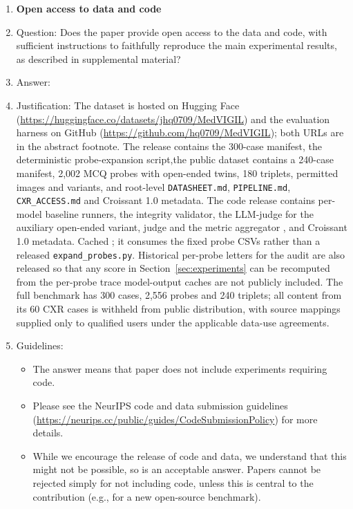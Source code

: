 \documentclass{article}
\providecommand{\DIFaddtex}[1]{{\protect\color{blue} \sf #1}} %
\providecommand{\DIFdeltex}[1]{{\protect\color{red} \scriptsize #1}} %
\providecommand{\DIFaddbegin}{} %
\providecommand{\DIFaddend}{} %
\providecommand{\DIFdelbegin}{} %
\providecommand{\DIFdelend}{} %
\providecommand{\DIFadd}[1]{\texorpdfstring{\DIFaddtex{#1}}{#1}} %
\providecommand{\DIFdel}[1]{\texorpdfstring{\DIFdeltex{#1}}{}} %
\begin{document}
\begin{enumerate}
\item {\bf Open access to data and code}
    \item[] Question: Does the paper provide open access to the data and code, with sufficient instructions to faithfully reproduce the main experimental results, as described in supplemental material?
    \item[] Answer: \answerYes{}
    \item[] Justification: The dataset is hosted on Hugging Face (\url{https://huggingface.co/datasets/jhq0709/MedVIGIL}) and the evaluation harness on GitHub (\url{https://github.com/hq0709/MedVIGIL}); both URLs are in the abstract footnote. The \DIFdelbegin \DIFdel{release contains the 300-case manifest, the deterministic probe-expansion script,the }\DIFdelend \DIFaddbegin \DIFadd{public dataset contains a 240-case manifest, 2,002 MCQ probes with open-ended twins, 180 triplets, permitted images and variants, and root-level \texttt{DATASHEET.md}, \texttt{PIPELINE.md}, \texttt{CXR\_ACCESS.md} and Croissant 1.0 metadata. The code release contains }\DIFaddend per-model baseline runners, the integrity validator, the \DIFdelbegin \DIFdel{LLM-judge for the }\DIFdelend \DIFaddbegin \DIFadd{auxiliary }\DIFaddend open-ended \DIFdelbegin \DIFdel{variant, }\DIFdelend \DIFaddbegin \DIFadd{judge and }\DIFaddend the metric aggregator\DIFdelbegin \DIFdel{, and Croissant 1.0 metadata. Cached }\DIFdelend \DIFaddbegin \DIFadd{; it consumes the fixed probe CSVs rather than a released \texttt{expand\_probes.py}. Historical }\DIFaddend per-probe \DIFdelbegin \DIFdel{letters for the audit are also released so that any score in Section~\ref{sec:experiments} can be recomputed from the per-probe trace}\DIFdelend \DIFaddbegin \DIFadd{model-output caches are not publicly included. The full benchmark has 300 cases, 2,556 probes and 240 triplets; all content from its 60 CXR cases is withheld from public distribution, with source mappings supplied only to qualified users under the applicable data-use agreements}\DIFaddend .
    \item[] Guidelines:
    \begin{itemize}
        \item The answer \answerNA{} means that paper does not include experiments requiring code.
        \item Please see the NeurIPS code and data submission guidelines (\url{https://neurips.cc/public/guides/CodeSubmissionPolicy}) for more details.
        \item While we encourage the release of code and data, we understand that this might not be possible, so \answerNo{} is an acceptable answer. Papers cannot be rejected simply for not including code, unless this is central to the contribution (e.g., for a new open-source benchmark).

\end{itemize}
\end{enumerate}
\end{document}
